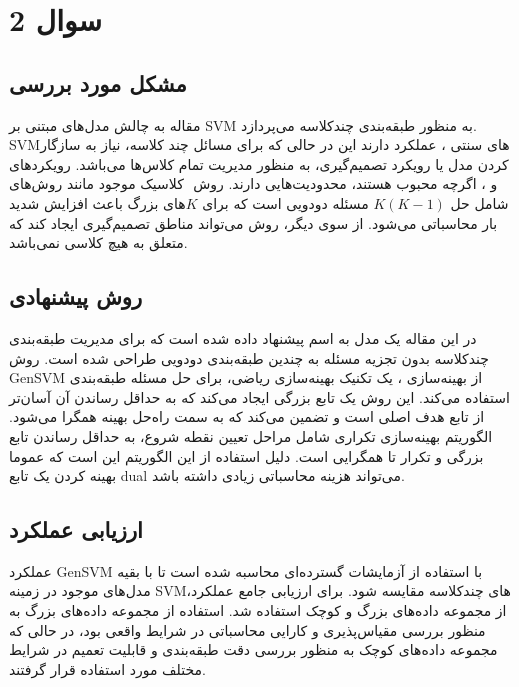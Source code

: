 \documentclass{article}
\begin{document}
	
	
	
	\tableofcontents \clearpage
	\listoffigures \clearpage
	\listoftables \clearpage
	\lstlistoflistings \clearpage
	\newpage
	
\section{سوال 2}

\subsection{مشکل مورد بررسی}

مقاله به چالش مدل‌های مبتنی بر SVM به منظور طبقه‌بندی چندکلاسه می‌پردازد. SVMهای سنتی ، عملکرد
 دارند این در حالی که برای مسائل چند کلاسه، نیاز به سازگار کردن مدل یا رویکرد تصمیم‌گیری، به منظور مدیریت تمام کلاس‌ها می‌باشد. رویکردهای کلاسیک موجود مانند روش‌های 
 ‎
  و
  ، اگرچه محبوب هستند، محدودیت‌هایی دارند. روش
   شامل حل
 $K(K-1)$ 
 مسئله دودویی است که برای
 $K$های
 بزرگ باعث افزایش شدید بار محاسباتی می‌شود. از سوی دیگر، روش
  می‌تواند مناطق تصمیم‌گیری ایجاد کند که متعلق به هیچ کلاسی نمی‌باشد.

\subsection{روش پیشنهادی}

در این مقاله یک مدل به اسم
پیشنهاد داده شده است که برای مدیریت طبقه‌بندی چندکلاسه بدون تجزیه مسئله به چندین طبقه‌بندی دودویی طراحی شده است. روش GenSVM از بهینه‌سازی 
، یک تکنیک بهینه‌سازی ریاضی، برای حل مسئله طبقه‌بندی استفاده می‌کند. این روش یک تابع بزرگی ایجاد می‌کند که به حداقل رساندن آن آسان‌تر از تابع هدف اصلی است و تضمین می‌کند که به سمت راه‌حل بهینه همگرا می‌شود. الگوریتم بهینه‌سازی تکراری شامل مراحل تعیین نقطه شروع، به حداقل رساندن تابع بزرگی و تکرار تا همگرایی است. دلیل استفاده از این الگوریتم این است که عموما بهینه کردن یک تابع dual می‌تواند هزینه محاسباتی زیادی داشته باشد.

\subsection{ارزیابی عملکرد}

عملکرد GenSVM با استفاده از آزمایشات گسترده‌ای محاسبه شده است تا با بقیه مدل‌های موجود در زمینه SVMهای چندکلاسه مقایسه شود. برای ارزیابی جامع عملکرد، از مجموعه داده‌های بزرگ و کوچک استفاده شد. استفاده از مجموعه داده‌های بزرگ به منظور بررسی مقیاس‌پذیری و کارایی محاسباتی در شرایط واقعی بود، در حالی که مجموعه داده‌های کوچک به منظور بررسی دقت طبقه‌بندی و قابلیت تعمیم در شرایط مختلف مورد استفاده قرار گرفتند.
\end{document}
